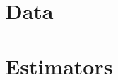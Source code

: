 \documentclass[11pt,twoside]{report}
\begin{document}
\section{Data}
\label{sec:data}


\section{Estimators}
\label{sec:estimators}

\end{document}
